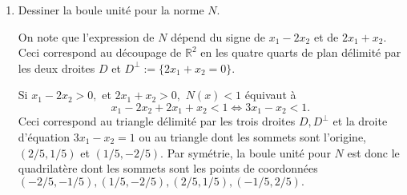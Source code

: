 \documentclass[a4paper]{tp_um}
\begin{document}
\begin{enumerate}
	{\bf In\'egalit\'e triangulaire :} Pour tout $x=(x_1,x_2)$ et $y=(y_1,y_2)$ dans $\mathbb R^2,$ on remarque que, 
	en appliquant l'in\'egalit\'e triangulaire dans $\mathbb R:$
	\begin{align*}
	N(x+y) & =  |(x_1 + y_1 - 2(x_2+y_2) | + |2(x_1+y_1) + (x_2+y_2)| \\
				& \leq    |x_1- 2x_2 |+  |y_1 - 2y_2 | + |2x_1 + x_2 | + |2y_1 + y_2| \\
				& \leq N(x) + N(y). 	 
	\end{align*} 
	
	\medskip

    \item  Dessiner la boule unité pour la norme $N$.

	\bigskip

On note que l'expression de $N$ d\'epend du signe de $x_1-2x_2$ et de $2x_1+x_2.$ Ceci correspond au d\'ecoupage de $\mathbb R^2$ en les quatre quarts de plan d\'elimit\'e par les deux droites $D$  et  $D^{\bot} := \{2x_1+x_2 = 0\}.$ 

Si $x_1 -2 x_2 >0,$ et $2x_1+x_2>0,$ $N(x) < 1$ 
\'equivaut \`a 
\[
{x_1 - 2 x_2} + 2x_1 + x_2 < 1 
\Leftrightarrow 
3 x_1 - x_2 < 1.   
\]  
Ceci correspond au triangle d\'elimit\'e par les trois droites $D,D^{\bot}$ et la droite d'\'equation $
3x_1 - x_2 = 1$ ou au triangle dont les sommets sont l'origine, 
$(2/5,1/5)$ et $(1/5,-2/5).$ Par sym\'etrie, la boule unit\'e pour $N$ est donc le quadrilat\`ere dont les sommets sont les points de coordonn\'ees $(-2/5,-1/5),(1/5,-2/5),(2/5,1/5),(-1/5,2/5).$

    
        \begin{center}
\end{center}
\end{enumerate}
\end{document}
